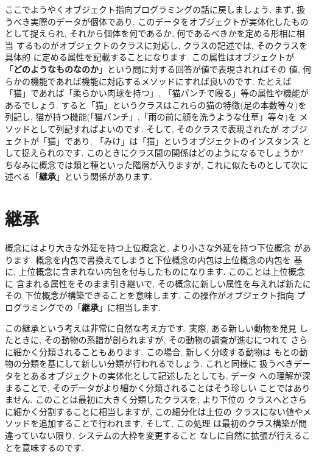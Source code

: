ここでようやくオブジェクト指向プログラミングの話に戻しましょう. まず,
 扱うべき実際のデータが個体であり, このデータをオブジェクトが実体化したもの
として捉えられ, それから個体を何であるか, 何であるべきかを定める形相に相当
するものがオブジェクトのクラスに対応し, クラスの記述では, そのクラスを具体的
に定める属性を記載することになります. この属性はオブジェクトが
「\textbf{どのようなものなのか}」という問に対する回答が値で表現されればその
値,  何らかの機能であれば機能に対応するメソッドにすれば良いのです. たとえば
「猫」であれば「柔らかい肉球を持つ」, 「猫パンチで殴る」等の属性や機能が
あるでしょう. すると「猫」というクラスはこれらの猫の特徴(足の本数等々)を
列記し, 猫が持つ機能(「猫パンチ」,「雨の前に顔を洗うような仕草」等々)を
メソッドとして列記すればよいのです. そして, そのクラスで表現されたが
オブジェクトが「猫」であり, 「みけ」は「猫」というオブジェクトのインスタンス
として捉えられのです. このときにクラス間の関係はどのようになるでしょうか?
 ちなみに概念では類と種といった階層が入りますが, これに似たものとして次に
述べる「\textbf{継承}」という関係があります.


\section{継承}


概念にはより大きな外延を持つ上位概念と, より小さな外延を持つ下位概念
があります. 概念を内包で書換えてしまうと下位概念の内包は上位概念の内包を
基に, 上位概念に含まれない内包を付与したものになります. このことは上位概念に
含まれる属性をそのまま引き継いで, その概念に新しい属性を与えれば新たにその
下位概念が構築できることを意味します. この操作がオブジェクト指向
プログラミングでの「\textbf{継承}」に相当します.
\newline


この継承という考えは非常に自然な考え方です. 実際, ある新しい動物を発見
したときに, その動物の系譜が創られますが, その動物の調査が進むにつれて
さらに細かく分類されることもあります. この場合, 新しく分岐する動物は
もとの動物の分類を基にして新しい分類が行われるでしょう. これと同様に
扱うべきデータをとあるオブジェクトの実体化として記述したとしても, データ
への理解が深まることで, そのデータがより細かく分類されることはそう珍しい
ことではありません. このことは最初に大きく分類したクラスを, より下位の
クラスへとさらに細かく分割することに相当しますが, この細分化は上位の
クラスにない値やメソッドを追加することで行われます. そして, この処理
は最初のクラス構築が間違っていない限り, システムの大枠を変更すること
なしに自然に拡張が行えることを意味するのです.
\newline


